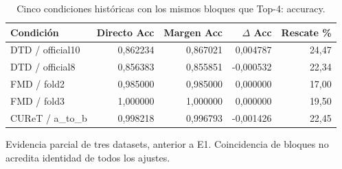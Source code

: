 \begin{table}[!htbp]\centering
\fontsize{9}{11}\selectfont\setlength{\tabcolsep}{4pt}
\caption{Cinco condiciones históricas con los mismos bloques que Top-4: accuracy.}\label{tab:tm-fixed4-margin}
\begin{tabular}{@{}lrrrr@{}}\toprule
Condición & Directo Acc & Margen Acc & $\Delta$ Acc & Rescate \%\\\midrule
DTD / official10 & 0,862234 & 0,867021 & 0,004787 & 24,47\\
DTD / official8 & 0,856383 & 0,855851 & -0,000532 & 22,34\\
FMD / fold2 & 0,985000 & 0,985000 & 0,000000 & 17,00\\
FMD / fold3 & 1,000000 & 1,000000 & 0,000000 & 19,50\\
CUReT / a_to_b & 0,998218 & 0,996793 & -0,001426 & 22,45\\
\bottomrule\end{tabular}
\par\smallskip\begin{minipage}{0.98\textwidth}\footnotesize Evidencia parcial de tres datasets, anterior a E1. Coincidencia de bloques no acredita identidad de todos los ajustes.\end{minipage}
\end{table}
